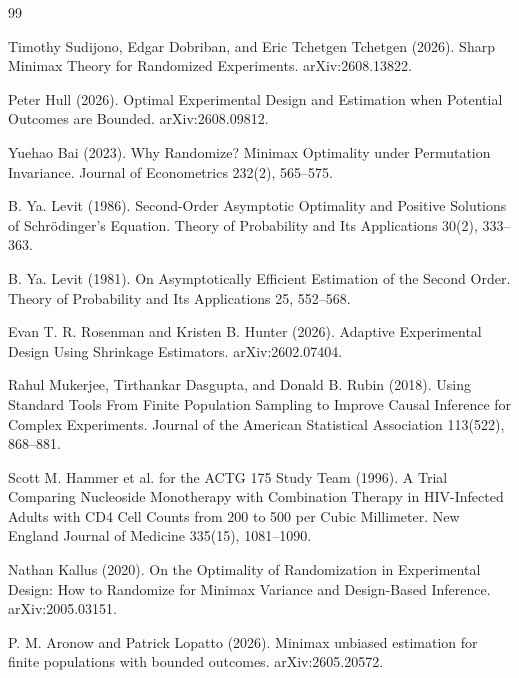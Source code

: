 \documentclass{article}
\begin{document}
\begin{thebibliography}{99}

   Timothy Sudijono, Edgar Dobriban, and Eric Tchetgen Tchetgen (2026). Sharp Minimax Theory for Randomized Experiments. arXiv:2608.13822.

   Peter Hull (2026). Optimal Experimental Design and Estimation when Potential Outcomes are Bounded. arXiv:2608.09812.

   Yuehao Bai (2023). Why Randomize? Minimax Optimality under Permutation Invariance. Journal of Econometrics 232(2), 565--575.

   B. Ya. Levit (1986). Second-Order Asymptotic Optimality and Positive Solutions of Schrödinger's Equation. Theory of Probability and Its Applications 30(2), 333--363.

   B. Ya. Levit (1981). On Asymptotically Efficient Estimation of the Second Order. Theory of Probability and Its Applications 25, 552--568.

   Evan T. R. Rosenman and Kristen B. Hunter (2026). Adaptive Experimental Design Using Shrinkage Estimators. arXiv:2602.07404.

   Rahul Mukerjee, Tirthankar Dasgupta, and Donald B. Rubin (2018). Using Standard Tools From Finite Population Sampling to Improve Causal Inference for Complex Experiments. Journal of the American Statistical Association 113(522), 868--881.

   Scott M. Hammer et al. for the ACTG 175 Study Team (1996). A Trial Comparing Nucleoside Monotherapy with Combination Therapy in HIV-Infected Adults with CD4 Cell Counts from 200 to 500 per Cubic Millimeter. New England Journal of Medicine 335(15), 1081--1090.

   Nathan Kallus (2020). On the Optimality of Randomization in Experimental Design: How to Randomize for Minimax Variance and Design-Based Inference. arXiv:2005.03151.

   P. M. Aronow and Patrick Lopatto (2026). Minimax unbiased estimation for finite populations with bounded outcomes. arXiv:2605.20572.

\end{thebibliography}
\end{document}

